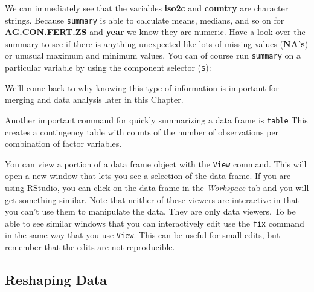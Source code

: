 \noindent We can immediately see that the variables \textbf{iso2c} and \textbf{country} are character strings. Because \texttt{summary} is able to calculate means, medians, and so on for \textbf{AG.CON.FERT.ZS} and \textbf{year} we know they are numeric. Have a look over the summary to see if there is anything unexpected like lots of missing values (\textbf{NA's}) or unusual maximum and minimum values. You can of course run \texttt{summary} on a particular variable by using the component selector (\verb|$|):

\begin{knitrout}
\color{fgcolor}
\end{knitrout}


\noindent We'll come back to why knowing this type of information is important for merging and data analysis later in this Chapter.

Another important command for quickly summarizing a data frame is \texttt{table} This creates a contingency table with counts of the number of observations per combination of factor variables.

You can view a portion of a data frame object with the \texttt{View} command. This will open a new window that lets you see a selection of the data frame. If you are using RStudio, you can click on the data frame in the \emph{Workspace} tab and you will get something similar. Note that neither of these viewers are interactive in that you can't use them to manipulate the data. They are only data viewers. To be able to see similar windows that you can interactively edit use the \texttt{fix} command in the same way that you use \texttt{View}. This can be useful for small edits, but remember that the edits are not reproducible.

\subsection{Reshaping Data}

